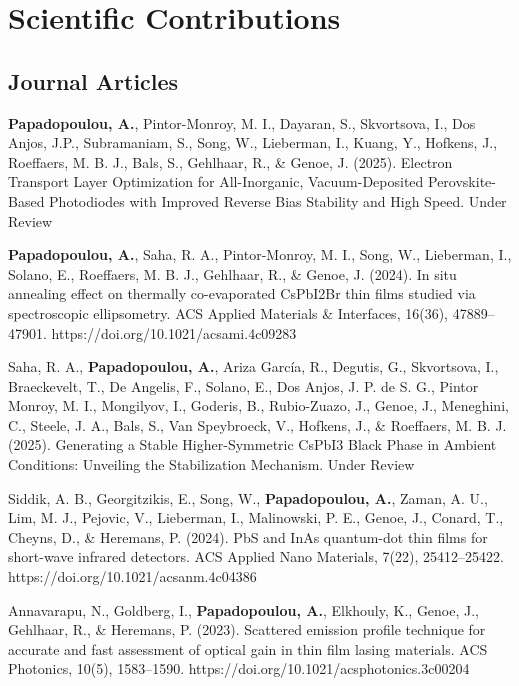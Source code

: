 \chapter{Scientific Contributions}\label{ch:publications}

\section*{Journal Articles}

\textbf{Papadopoulou, A.}, Pintor-Monroy, M. I., Dayaran, S., Skvortsova, I., Dos Anjos, J.P., Subramaniam, S., Song, W., Lieberman, I., Kuang, Y., Hofkens, J., Roeffaers, M. B. J., Bals, S., Gehlhaar, R., \& Genoe, J. (2025). Electron Transport Layer Optimization for All-Inorganic, Vacuum-Deposited Perovskite-Based Photodiodes with Improved Reverse Bias Stability and High Speed. Under Review

\textbf{Papadopoulou, A.}, Saha, R. A., Pintor-Monroy, M. I., Song, W., Lieberman, I., Solano, E., Roeffaers, M. B. J., Gehlhaar, R., \& Genoe, J. (2024). In situ annealing effect on thermally co-evaporated CsPbI2Br thin films studied via spectroscopic ellipsometry. ACS Applied Materials \& Interfaces, 16(36), 47889–47901. https://doi.org/10.1021/acsami.4c09283

Saha, R. A., \textbf{Papadopoulou, A.}, Ariza García, R., Degutis, G., Skvortsova, I., Braeckevelt, T., De Angelis, F., Solano, E., Dos Anjos, J. P. de S. G., Pintor Monroy, M. I., Mongilyov, I., Goderis, B., Rubio-Zuazo, J., Genoe, J., Meneghini, C., Steele, J. A., Bals, S., Van Speybroeck, V., Hofkens, J., \& Roeffaers, M. B. J. (2025). Generating a Stable Higher-Symmetric CsPbI3 Black Phase in Ambient Conditions: Unveiling the Stabilization Mechanism. Under Review

Siddik, A. B., Georgitzikis, E., Song, W., \textbf{Papadopoulou, A.}, Zaman, A. U., Lim, M. J., Pejovic, V., Lieberman, I., Malinowski, P. E., Genoe, J., Conard, T., Cheyns, D., \& Heremans, P. (2024). PbS and InAs quantum-dot thin films for short-wave infrared detectors. ACS Applied Nano Materials, 7(22), 25412–25422. https://doi.org/10.1021/acsanm.4c04386

Annavarapu, N., Goldberg, I., \textbf{Papadopoulou, A.}, Elkhouly, K., Genoe, J., Gehlhaar, R., \& Heremans, P. (2023). Scattered emission profile technique for accurate and fast assessment of optical gain in thin film lasing materials. ACS Photonics, 10(5), 1583–1590. https://doi.org/10.1021/acsphotonics.3c00204


